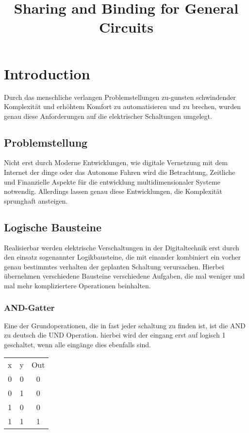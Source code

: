 \documentclass[conference]{IEEEtran}
\begin{document}
\begin{titlepage}

\title{Sharing and Binding for General Circuits\\}

\author{
}
\maketitle
\begin{abstract}

\end{abstract}
\end{titlepage}
\newpage

\section{Introduction}
Durch das menschliche verlangen Problemstellungen zu-gunsten schwindender Komplexität und erhöhtem Komfort zu automatisieren und zu brechen, wurden genau diese Anforderungen auf die elektrischer Schaltungen umgelegt. 
\subsection{Problemstellung}
Nicht erst durch Moderne Entwicklungen, wie digitale Vernetzung mit dem Internet der dinge  oder das Autonome Fahren wird die Betrachtung,  Zeitliche und Finanzielle Aspekte für die entwicklung multidimensionaler Systeme notwendig. Allerdings lassen genau diese Entwicklungen, die Komplexität sprunghaft ansteigen.

\subsection{Logische Bausteine}
Realisierbar werden elektrische Verschaltungen in der Digitaltechnik erst durch den einsatz sogenannter Logikbausteine, die mit einander kombiniert ein vorher genau bestimmtes verhalten der geplanten Schaltung verursachen.
Hierbei übernehmen verschiedene Bausteine verschiedene Aufgaben, die mal weniger und mal mehr kompliziertere Operationen beinhalten. 
\subsubsection{AND-Gatter}
Eine der Grundoperationen, die in fast jeder schaltung zu finden ist, ist die AND zu deutsch die UND Operation. hierbei wird der eingang erst auf logisch 1 geschaltet, wenn alle eingänge dies ebenfalls sind.\\
\begin{tabular}[h]{ccc}
x&y&Out\\
0&0&0\\
0&1&0\\
1&0&0\\
1&1&1\\
\end{tabular}
\end{document}
